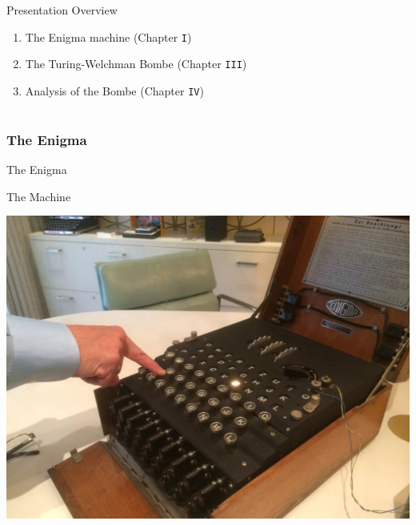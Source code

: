 \documentclass[hyphens,aspectratio=169]{beamer}
\begin{document}
\begin{frame}[fragile]{Presentation Overview}
	\begin{enumerate}
		\item The Enigma machine (Chapter \texttt{I})
		      \pause
		      \vspace{5mm}
		\item The Turing-Welchman Bombe (Chapter \texttt{III})
		      \pause
		      \vspace{5mm}

		\item Analysis of the Bombe (Chapter \texttt{IV})
	\end{enumerate}

\end{frame}


\part{}

\section{The Enigma}

\begin{frame}[fragile]{}
	\Huge
	\begin{center}
		The Enigma
	\end{center}
\end{frame}

\begin{frame}[fragile]{The Machine}
	\Huge
	\begin{center}
		\includegraphics[scale=0.2]{paper/images/enigma.jpg}
	\end{center}
\end{frame}
\end{document}
